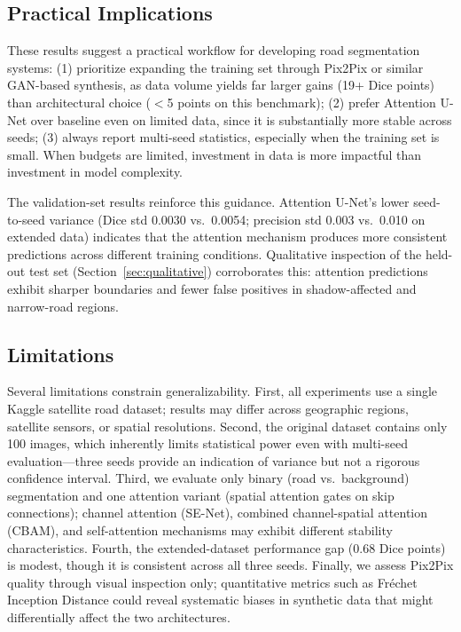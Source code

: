 \documentclass[conference]{IEEEtran}
\begin{document}
\subsection{Practical Implications}

These results suggest a practical workflow for developing road segmentation systems: (1) prioritize expanding the training set through Pix2Pix or similar GAN-based synthesis, as data volume yields far larger gains (19+ Dice points) than architectural choice ($<$5 points on this benchmark); (2) prefer Attention U-Net over baseline even on limited data, since it is substantially more stable across seeds; (3) always report multi-seed statistics, especially when the training set is small. When budgets are limited, investment in data is more impactful than investment in model complexity.

The validation-set results reinforce this guidance. Attention U-Net's lower seed-to-seed variance (Dice std 0.0030 vs.\ 0.0054; precision std 0.003 vs.\ 0.010 on extended data) indicates that the attention mechanism produces more consistent predictions across different training conditions. Qualitative inspection of the held-out test set (Section~\ref{sec:qualitative}) corroborates this: attention predictions exhibit sharper boundaries and fewer false positives in shadow-affected and narrow-road regions.

\subsection{Limitations}

Several limitations constrain generalizability. First, all experiments use a single Kaggle satellite road dataset; results may differ across geographic regions, satellite sensors, or spatial resolutions. Second, the original dataset contains only 100 images, which inherently limits statistical power even with multi-seed evaluation---three seeds provide an indication of variance but not a rigorous confidence interval. Third, we evaluate only binary (road vs.\ background) segmentation and one attention variant (spatial attention gates on skip connections); channel attention (SE-Net), combined channel-spatial attention (CBAM), and self-attention mechanisms may exhibit different stability characteristics. Fourth, the extended-dataset performance gap (0.68 Dice points) is modest, though it is consistent across all three seeds. Finally, we assess Pix2Pix quality through visual inspection only; quantitative metrics such as Fr\'{e}chet Inception Distance could reveal systematic biases in synthetic data that might differentially affect the two architectures.
\end{document}
